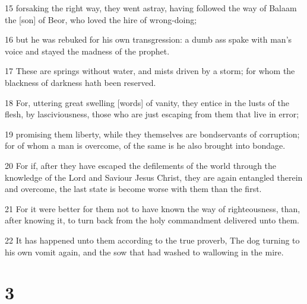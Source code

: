 \par 15 forsaking the right way, they went astray, having followed the way of Balaam the [son] of Beor, who loved the hire of wrong-doing;
\par 16 but he was rebuked for his own transgression: a dumb ass spake with man's voice and stayed the madness of the prophet.
\par 17 These are springs without water, and mists driven by a storm; for whom the blackness of darkness hath been reserved.
\par 18 For, uttering great swelling [words] of vanity, they entice in the lusts of the flesh, by lasciviousness, those who are just escaping from them that live in error;
\par 19 promising them liberty, while they themselves are bondservants of corruption; for of whom a man is overcome, of the same is he also brought into bondage.
\par 20 For if, after they have escaped the defilements of the world through the knowledge of the Lord and Saviour Jesus Christ, they are again entangled therein and overcome, the last state is become worse with them than the first.
\par 21 For it were better for them not to have known the way of righteousness, than, after knowing it, to turn back from the holy commandment delivered unto them.
\par 22 It has happened unto them according to the true proverb, The dog turning to his own vomit again, and the sow that had washed to wallowing in the mire.

\chapter{3}

